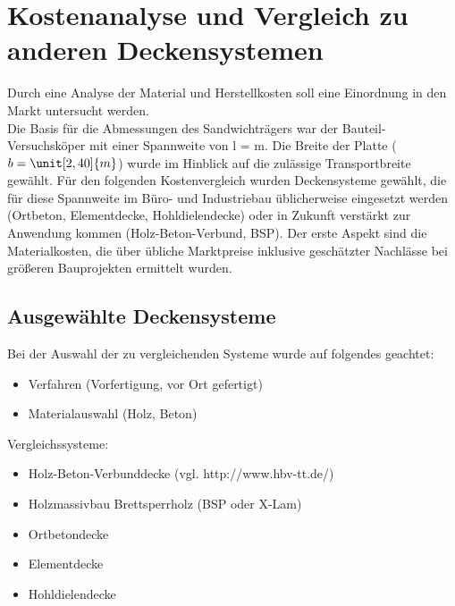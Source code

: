 

\chapter{Kostenanalyse und Vergleich zu anderen Deckensystemen}
Durch eine Analyse der Material und Herstellkosten soll eine Einordnung in den Markt untersucht werden.\\
\cite{1}
Die Basis für die Abmessungen des Sandwichträgers war der Bauteil-Versuchsköper mit einer Spannweite von l = \unit[7,20]{m}. Die Breite der Platte ($b=\unit[2,40]{m}$) wurde im Hinblick auf die zulässige Transportbreite gewählt.
Für den folgenden Kostenvergleich wurden Deckensysteme gewählt, die für diese Spannweite im Büro- und Industriebau üblicherweise eingesetzt werden (Ortbeton, Elementdecke, Hohldielendecke) oder in Zukunft verstärkt zur Anwendung kommen (Holz-Beton-Verbund, BSP). 
Der erste Aspekt sind die Materialkosten, die über übliche Marktpreise inklusive geschätzter Nachlässe bei größeren Bauprojekten ermittelt wurden. %



\section{Ausgewählte Deckensysteme}
Bei der Auswahl der zu vergleichenden Systeme wurde auf folgendes geachtet:\\
\begin{itemize}
	\item Verfahren (Vorfertigung, vor Ort gefertigt)
	\item Materialauswahl (Holz, Beton)
\end{itemize}
Vergleichssysteme:\\

\begin{itemize}
\item Holz-Beton-Verbunddecke (vgl. http://www.hbv-tt.de/)
\item Holzmassivbau Brettsperrholz (BSP oder X-Lam)
\item Ortbetondecke
\item Elementdecke
\item Hohldielendecke
\end{itemize}

